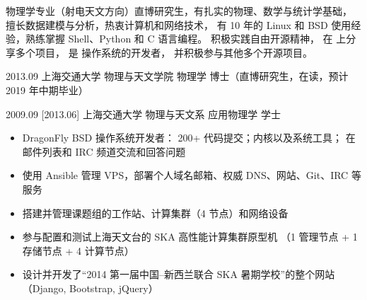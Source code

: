 \documentclass[zh]{resume}
\begin{document}
\makeheader

{\onehalfspacing\hspace{2em}%
物理学专业（射电天文方向）直博研究生，有扎实的物理、数学与统计学基础，
擅长数据建模与分析，热衷计算机和网络技术，
有 10 年的 Linux 和 BSD 使用经验，熟练掌握 Shell、Python 和 C 语言编程。
积极实践自由开源精神，
在  上分享多个项目，
是  操作系统的开发者，
并积极参与其他多个开源项目。
\par}

\begin{competences}
\end{competences}

\begin{educations}
  \education%
    {2013.09}%
    {上海交通大学}%
    {物理与天文学院}%
    {物理学}%
    {博士（直博研究生，在读，预计 2019 年中期毕业）}

  \separator{0.5ex}
  \education%
    {2009.09}%
    [2013.06]%
    {上海交通大学}%
    {物理与天文系}%
    {应用物理学}%
    {学士}
\end{educations}

\begin{itemize}
  \item DragonFly BSD 操作系统开发者：
    200+ 代码提交；内核以及系统工具；
    在邮件列表和 IRC 频道交流和回答问题
  \item 使用 Ansible 管理 VPS，部署个人域名邮箱、权威 DNS、网站、Git、IRC 等服务
  \item 搭建并管理课题组的工作站、计算集群（4 节点）和网络设备
  \item 参与配置和测试上海天文台的 SKA 高性能计算集群原型机
    （1 管理节点 + 1 存储节点 + 4 计算节点）
  \item 设计并开发了\enquote{2014 第一届中国--新西兰联合 SKA 暑期学校}的整个网站
    （Django, Bootstrap, jQuery）
\end{itemize}
\end{document}

